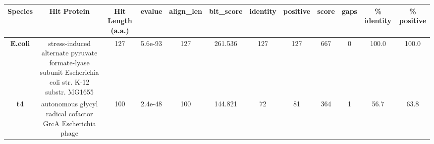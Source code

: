 \begin{tabular}{|c|c|c|c|c|c|c|c|c|c|c|c|} \hline
\textbf{Species} & \textbf{Hit Protein} & \textbf{Hit Length (a.a.)} & \textbf{evalue} & \textbf{align\_len} & \textbf{bit\_score} & \textbf{identity} & \textbf{positive} & \textbf{score} & \textbf{gaps} & \textbf{\% identity} & \textbf{\% positive} \\ \hline
\textbf{E.coli} & stress-induced alternate pyruvate formate-lyase subunit Escherichia coli str. K-12 substr. MG1655 & 127 & 5.6e-93 & 127 & 261.536 & 127 & 127 & 667 & 0 & 100.0 & 100.0\\
\textbf{t4} & autonomous glycyl radical cofactor GrcA Escherichia phage  & 100 & 2.4e-48 & 100 & 144.821 & 72 & 81 & 364 & 1 & 56.7 & 63.8\\
\hline \end{tabular}
